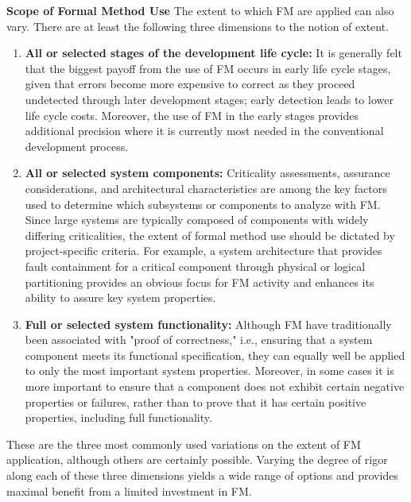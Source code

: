 \documentclass{template/openetcs_report}
\begin{document}
\textbf{Scope of Formal Method Use}
The extent to which FM are applied can also vary. There are at least the following three dimensions to the notion of extent.
\begin{enumerate}\itemsep=0pt
  \item \textbf{All or selected stages of the development life cycle:} It is generally felt that the biggest payoff from the use of FM occurs in early life cycle stages, given that errors become more expensive to correct as they proceed undetected through later development stages; early detection leads to lower life cycle costs. Moreover, the use of FM in the early stages provides additional precision where it is currently most needed in the conventional development process.
  \item \textbf{All or selected system components:} Criticality assessments, assurance considerations, and architectural characteristics are among the key factors used to determine which subsystems or components to analyze with FM. Since large systems are typically composed of components with widely differing criticalities, the extent of formal method use should be dictated by project-specific criteria. For example, a system architecture that provides fault containment for a critical component through physical or logical partitioning provides an obvious focus for FM activity and enhances its ability to assure key system properties.
  \item \textbf{Full or selected system functionality:} Although FM have traditionally been associated with "proof of correctness," i.e., ensuring that a system component meets its functional specification, they can equally well be applied to only the most important system properties. Moreover, in some cases it is more important to ensure that a component does not exhibit certain negative properties or failures, rather than to prove that it has certain positive properties, including full functionality.
\end{enumerate}
These are the three most commonly used variations on the extent of FM application, although others are certainly possible. Varying the degree of rigor along each of these three dimensions yields a wide range of options and provides maximal benefit from a limited investment in FM.
\end{document}
